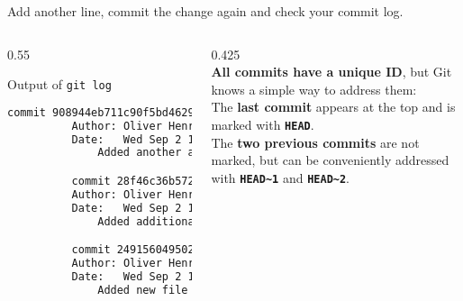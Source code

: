 \begin{frame}[fragile]
\emptyframetitle

  Add another line, commit the change again and check your commit log.

  \begin{columns}
    \begin{column}{0.55\textwidth}
      \begin{block}{Output of \texttt{git log}}
        \begin{lstlisting}[language=bash, basicstyle=\tiny\ttfamily]
          commit 908944eb711c90f5bd46297639b34d8fc70993f0 (HEAD -> master)
          Author: Oliver Henrich <ohenrich@users.noreply.github.com>
          Date:   Wed Sep 2 16:59:00 2020 +0100
              Added another additional line

          commit 28f46c36b5729ab26ca719cc1468b1a6e734d597
          Author: Oliver Henrich <ohenrich@users.noreply.github.com>
          Date:   Wed Sep 2 16:58:15 2020 +0100
              Added additional line

          commit 249156049502e47d839735c34e31830885bc5092
          Author: Oliver Henrich <ohenrich@users.noreply.github.com>
          Date:   Wed Sep 2 16:56:07 2020 +0100
              Added new file
        \end{lstlisting}
      \end{block}
    \end{column}

    \begin{column}{0.425\textwidth}
      \vspace*{0.cm}\\
      \textbf{All commits have a unique ID}, but Git knows a simple way to address them:\\
      \vspace*{0.4cm}
      The \textbf{last commit} appears at the top and is marked with \texttt{\textbf{HEAD}}.
      \vspace*{0.7cm}\\
      The \textbf{two previous commits} are not marked, but can be conveniently addressed with \textbf{\texttt{HEAD\textasciitilde1}} and \textbf{\texttt{HEAD\textasciitilde2}}.
    \end{column}
  \end{columns}

\end{frame}

